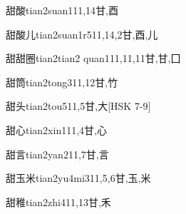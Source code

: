 \begin{EntryWithPhonetic}{甜酸}{tian2suan1}{11,14}{⽢,⾣}
\end{EntryWithPhonetic}

\begin{EntryWithPhonetic}{甜酸儿}{tian2suan1r5}{11,14,2}{⽢,⾣,⼉}
\end{EntryWithPhonetic}

\begin{EntryWithPhonetic}{甜甜圈}{tian2tian2 quan1}{11,11,11}{⽢,⽢,⼞}
\end{EntryWithPhonetic}

\begin{EntryWithPhonetic}{甜筒}{tian2tong3}{11,12}{⽢,⽵}
\end{EntryWithPhonetic}

\begin{EntryWithPhonetic}{甜头}{tian2tou5}{11,5}{⽢,⼤}[HSK 7-9]
\end{EntryWithPhonetic}

\begin{EntryWithPhonetic}{甜心}{tian2xin1}{11,4}{⽢,⼼}
\end{EntryWithPhonetic}

\begin{EntryWithPhonetic}{甜言}{tian2yan2}{11,7}{⽢,⾔}
\end{EntryWithPhonetic}

\begin{EntryWithPhonetic}{甜玉米}{tian2yu4mi3}{11,5,6}{⽢,⽟,⽶}
\end{EntryWithPhonetic}

\begin{EntryWithPhonetic}{甜稚}{tian2zhi4}{11,13}{⽢,⽲}
\end{EntryWithPhonetic}

